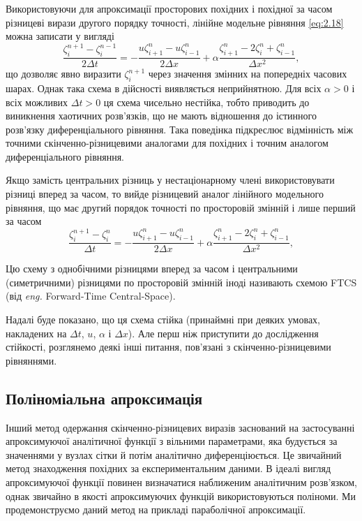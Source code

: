 Використовуючи для апроксимації просторових похідних і похідної за часом різницеві вирази другого порядку точності, лінійне модельне рівняння \eqref{eq:2.18} можна записати у вигляді
\begin{equation}
    \label{eq:3.17}
    \frac{\zeta_i^{n + 1} - \zeta_i^{n - 1}}{2 \Delta t} = - \frac{u \zeta_{i + 1}^n - u \zeta_{i - 1}^n}{2 \Delta x} + \alpha \frac{\zeta_{i + 1}^n - 2 \zeta_i^n + \zeta_{i - 1}^n}{\Delta x^2},
\end{equation}
що дозволяє явно виразити $\zeta_i^{n + 1}$ через значення змінних на попередніх часових шарах. Однак така схема в дійсності виявляється неприйнятною. Для всіх $\alpha > 0$ і всіх можливих $\Delta t > 0$ ця схема чисельно нестійка, тобто приводить до виникнення хаотичних розв'язків, що не мають відношення до істинного розв'язку диференціального рівняння. Така поведінка підкреслює відмінність між точними скінченно-різницевими аналогами для похідних і точним аналогом диференціального рівняння. \medskip

Якщо замість центральних різниць у нестаціонарному члені використовувати різниці вперед за часом, то вийде різницевий аналог лінійного модельного рівняння, що має другий порядок точності по просторовій змінній і лише перший за часом
\begin{equation}
    \label{eq:3.18}
    \frac{\zeta_i^{n + 1} - \zeta_i^n}{\Delta t} = - \frac{u \zeta_{i + 1}^n - u \zeta_{i - 1}^n}{2 \Delta x} + \alpha \frac{\zeta_{i + 1}^n - 2 \zeta_i^n + \zeta_{i - 1}^n}{\Delta x^2},
\end{equation}

\begin{definition}
    Цю схему з однобічними різницями вперед за часом і центральними (симетричними) різницями по просторовій змінній іноді називають схемою FTCS (від \textit{eng.} Forward-Time Central-Space).
\end{definition}

Надалі буде показано, що ця схема стійка (принаймні при деяких умовах, накладених на $\Delta t$, $u$, $\alpha$ і $\Delta x$). Але перш ніж приступити до дослідження стійкості, розглянемо деякі інші питання, пов'язані з скінченно-різницевими рівняннями.

\subsection{Поліноміальна апроксимація}

Інший метод одержання скінченно-різницевих виразів заснований на застосуванні апроксимуючої аналітичної функції з вільними параметрами, яка будується за значеннями у вузлах сітки й потім аналітично диференціюється. Це звичайний метод знаходження похідних за експериментальним даними. В ідеалі вигляд апроксимуючої функції повинен визначатися наближеним аналітичним розв'язком, однак звичайно в якості апроксимуючих функцій використовуються поліноми. Ми продемонструємо даний метод на прикладі параболічної апроксимації. \medskip

